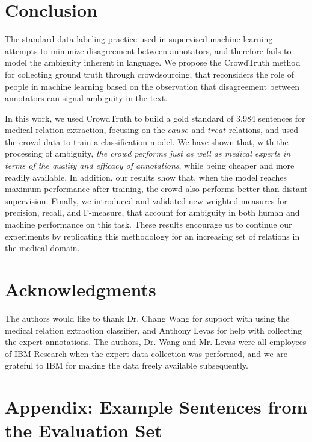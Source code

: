 \section{Conclusion}

The standard data labeling practice used in supervised machine learning attempts to minimize disagreement between annotators, and therefore fails to model the ambiguity inherent in language. We propose the CrowdTruth method for collecting ground truth through crowdsourcing, that reconsiders the role of people in machine learning based on the observation that disagreement between annotators can signal ambiguity in the text.

In this work, we used CrowdTruth to build a gold standard of 3,984 sentences for medical relation extraction, focusing on the $cause$ and $treat$ relations, and used the crowd data to train a classification model. We have shown that, with the processing of ambiguity, \textit{the crowd performs just as well as medical experts in terms of the quality and efficacy of annotations}, while being cheaper and more readily available. In addition, our results show that, when the model reaches maximum performance after training, the crowd also performs better than distant supervision. Finally, we introduced and validated new weighted measures for precision, recall, and F-measure, that account for ambiguity in both human and machine performance on this task. These results encourage us to continue our experiments by replicating this methodology for an increasing set of relations in the medical domain.


\section*{Acknowledgments}

The authors would like to thank Dr. Chang Wang for support with using the medical relation extraction classifier, and Anthony Levas for help with collecting the expert annotations.  The authors, Dr. Wang and Mr. Levas were all employees of IBM Research when the expert data collection was performed, and we are grateful to IBM for making the data freely available subsequently.


\section{Appendix: Example Sentences from the Evaluation Set}

